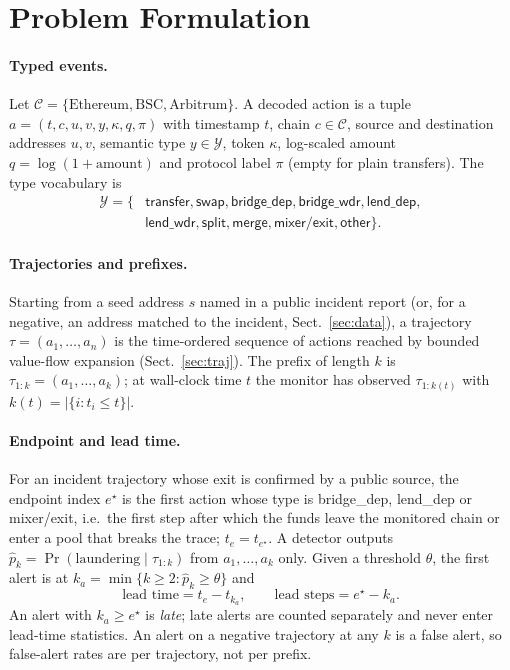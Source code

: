 \section{Problem Formulation}
\label{sec:problem}

\paragraph{Typed events.}
Let $\mathcal{C}=\{\text{Ethereum},\text{BSC},\text{Arbitrum}\}$.
A decoded action is a tuple $a=(t,c,u,v,y,\kappa,q,\pi)$ with timestamp $t$, chain $c\in\mathcal{C}$, source and destination addresses $u,v$, semantic type $y\in\mathcal{Y}$, token $\kappa$, log-scaled amount $q=\log(1+\text{amount})$ and protocol label $\pi$ (empty for plain transfers).
The type vocabulary is
\begin{align*}
\mathcal{Y}=\{&\textsf{transfer},\textsf{swap},\textsf{bridge\_dep},\textsf{bridge\_wdr},\textsf{lend\_dep},\\
&\textsf{lend\_wdr},\textsf{split},\textsf{merge},\textsf{mixer/exit},\textsf{other}\}.
\end{align*}

\paragraph{Trajectories and prefixes.}
Starting from a seed address $s$ named in a public incident report (or, for a negative, an address matched to the incident, Sect.~\ref{sec:data}), a trajectory $\tau=(a_1,\dots,a_n)$ is the time-ordered sequence of actions reached by bounded value-flow expansion (Sect.~\ref{sec:traj}).
The prefix of length $k$ is $\tau_{1:k}=(a_1,\dots,a_k)$; at wall-clock time $t$ the monitor has observed $\tau_{1:k(t)}$ with $k(t)=|\{i: t_i\le t\}|$.

\paragraph{Endpoint and lead time.}
For an incident trajectory whose exit is confirmed by a public source, the endpoint index $e^\star$ is the first action whose type is \textsf{bridge\_dep}, \textsf{lend\_dep} or \textsf{mixer/exit}, i.e.\ the first step after which the funds leave the monitored chain or enter a pool that breaks the trace; $t_e=t_{e^\star}$.
A detector outputs $\hat p_k=\Pr(\text{laundering}\mid\tau_{1:k})$ from $a_1,\dots,a_k$ only.
Given a threshold $\theta$, the first alert is at $k_a=\min\{k\ge2:\hat p_k\ge\theta\}$ and
\begin{equation}
\text{lead time}=t_e-t_{k_a},\qquad \text{lead steps}=e^\star-k_a .
\label{eq:lead}
\end{equation}
An alert with $k_a\ge e^\star$ is \emph{late}; late alerts are counted separately and never enter lead-time statistics.
An alert on a negative trajectory at any $k$ is a false alert, so false-alert rates are per trajectory, not per prefix.

